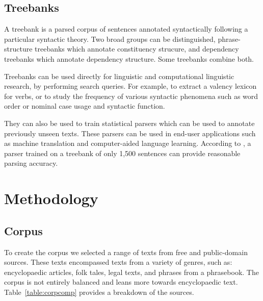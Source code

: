 \documentclass[a4paper,11pt, onecolumn,twoside]{article}
\begin{document}
\subsection{Treebanks} %

A treebank is a parsed corpus of sentences annotated syntactically following a particular
syntactic theory. Two broad groups can be distinguished, phrase-structure treebanks
which annotate constituency strucure, and dependency treebanks which annotate dependency
structure. Some treebanks combine both.

Treebanks can be used directly for linguistic and computational linguistic research, by
performing search queries. For example, to extract a valency lexicon for verbs, or to
study the frequency of various syntactic phenomena such as word order or nominal case usage
and syntactic function.

They can also be used to train statistical parsers which can
be used to annotate previously unseen texts. These parsers can be used in end-user applications
such as machine translation and computer-aided language learning.
According to \textcite{nivre08}, a parser trained on a treebank of only 1,500 sentences 
can provide reasonable parsing accuracy.


\section{Methodology}\label{sec:method}

\subsection{Corpus}

To create the corpus we selected a range of texts from free and public-domain sources. These texts encompassed 
texts from a variety of genres, such as: encyclopaedic articles, folk tales, legal texts, and phrases from a phrasebook.
The corpus is not entirely balanced and leans more towards encyclopaedic text. Table~\ref{table:corpcomp} provides
a breakdown of the sources.
\end{document}

